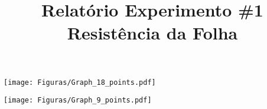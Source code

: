 \documentclass[10pt,a4paper]{article}
\title{Relatório Experimento \#1\\Resistência da Folha}
\begin{document}
\maketitle



\newpage
\begin{figure*}[htb]
	\centering
		\texttt{[image: Figuras/Graph\_18\_points.pdf]}
	\label{fig3}
\end{figure*}


\begin{figure*}[htb]
	\centering
		\texttt{[image: Figuras/Graph\_9\_points.pdf]}
	\label{fig4}
\end{figure*}


%
%
%
%
%


\small

%
%
\end{document}
